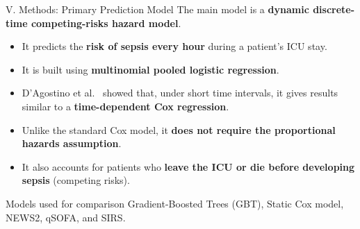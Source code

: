 \begin{frame}{V. Methods: Primary Prediction Model}
The main model is a \textbf{dynamic discrete-time competing-risks hazard
model}.

\vspace{6pt}
\begin{itemize}
  \item It predicts the \textbf{risk of sepsis every hour} during a patient's
        ICU stay.
  \item It is built using \textbf{multinomial pooled logistic regression}.
  \item D'Agostino et al.~\cite{dagostino1990pooled} showed that, under short
        time intervals, it gives results similar to a \textbf{time-dependent
        Cox regression}.
  \item Unlike the standard Cox model, it \textbf{does not require the
        proportional hazards assumption}.
  \item It also accounts for patients who \textbf{leave the ICU or die before
        developing sepsis} (competing risks).
\end{itemize}

\vspace{8pt}
\begin{exampleblock}{Models used for comparison}
Gradient-Boosted Trees (GBT), Static Cox model, NEWS2, qSOFA, and SIRS.
\end{exampleblock}
\end{frame}


